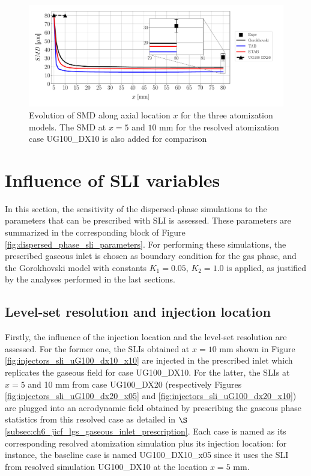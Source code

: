 \begin{figure}[h!]
\centering
\includegraphics[scale=0.475]{./part2_developments/figures_ch6_lagrangian_JICF/params_breakup_model/SMD_vs_x_breakup_models_comparison}
\caption[Evolution of SMD along axial location $x$ for the three atomization models]{Evolution of SMD along axial location $x$ for the three atomization models. The SMD at $x = 5$ and $10$ mm for the resolved atomization case UG100\_DX10 is also added for comparison}
\label{fig:SMD_vs_x_param_breakup_model}
\end{figure}

\clearpage

\section{Influence of SLI variables}
\label{sec:effect_of_SLI_variables}

In this section, the sensitivity of the dispersed-phase simulations to the parameters that can be prescribed with SLI is assessed. These parameters are summarized in the corresponding block of Figure \ref{fig:dispersed_phase_sli_parameters}. For performing these simulations, the prescribed gaseous inlet is chosen as boundary condition for the gas phase, and the Gorokhovski model with constants $K_1 = 0.05$, $K_2 = 1.0$ is applied, as justified by the analyses performed in the last sections.


\subsection{Level-set resolution and injection location}
\label{subsec:SLI_LGS_resolution_and_injection_location}


Firstly, the influence of the injection location and the level-set resolution are assessed. For the former one, the SLIs obtained at $x = 10$ mm shown in Figure \ref{fig:injectors_sli_uG100_dx10_x10} are injected in the prescribed inlet which replicates the gaseous field for case UG100\_DX10. For the latter, the SLIs at $x = 5$ and 10 mm  from case UG100\_DX20 (respectively Figures \ref{fig:injectors_sli_uG100_dx20_x05} and \ref{fig:injectors_sli_uG100_dx20_x10}) are plugged into an aerodynamic field obtained by prescribing the gaseous phase statistics from this resolved case as detailed in $\S$\ref{subsec:ch6_jicf_lgs_gaseous_inlet_prescription}. Each case is named as its corresponding resolved atomization simulation plus its injection location: for instance, the baseline case is named UG100\_DX10\_x05 since it uses the SLI from resolved simulation UG100\_DX10 at the location $x = 5$ mm.


